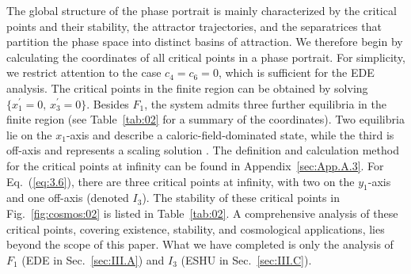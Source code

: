 \documentclass[aps,prd,twocolumn]{revtex4-2}
\begin{document}
The global structure of the phase portrait is mainly characterized by the critical points and their stability, the attractor trajectories, and the separatrices that partition the phase space into distinct basins of attraction. We therefore begin by calculating the coordinates of all critical points in a phase portrait. For simplicity, we restrict attention to the case $c_4=c_6=0$, which is sufficient for the EDE analysis. The critical points in the finite region can be obtained by solving $\{x_1^\prime=0,\,x_3^\prime=0\}$. Besides $F_1$, the system admits three further equilibria in the finite region (see Table~\ref{tab:02} for a summary of the coordinates). Two equilibria lie on the $x_1$-axis and describe a caloric-field-dominated state, while the third is off-axis and represents a scaling solution \cite{Copeland1998.PRD.57.4686}. The definition and calculation method for the critical points at infinity can be found in Appendix~\ref{sec:App.A.3}. For Eq.~(\ref{eq:3.6}), there are three critical points at infinity, with two on the $y_1$-axis and one off-axis (denoted $I_3$). The stability of these critical points in Fig.~\ref{fig:cosmos:02} is listed in Table~\ref{tab:02}. A comprehensive analysis of these critical points, covering existence, stability, and cosmological applications, lies beyond the scope of this paper. What we have completed is only the analysis of $F_1$ (EDE in Sec.~\ref{sec:III.A}) and $I_3$ (ESHU in Sec.~\ref{sec:III.C}).
\end{document}
